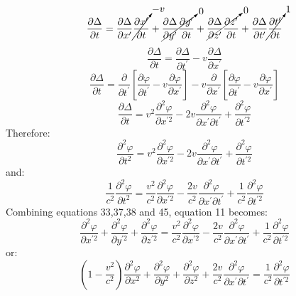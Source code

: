 \documentclass[journal]{IEEEtran}
\begin{document}
\begin{equation}
\frac{\partial\Delta}{\partial t} =
\frac{\partial\Delta}{\partial x^\prime}
\cancelto{-v}{\frac{\partial x^\prime}{\partial t}} +
\cancelto{0}{\frac{\partial\Delta}{\partial y^\prime}
\frac{\partial y^\prime}{\partial t}} +
\cancelto{0}{\frac{\partial\Delta}{\partial z^\prime}
\frac{\partial z^\prime}{\partial t}} +
\frac{\partial\Delta}{\partial t^\prime}
\cancelto{1}{\frac{\partial t^\prime}{\partial t}}
\end{equation}
\begin{equation}
\frac{\partial\Delta}{\partial t} =
\frac{\partial\Delta}{\partial t^\prime}
- v \frac{\partial\Delta}{\partial x^\prime}
\end{equation}
\begin{equation}
\frac{\partial\Delta}{\partial t} = 
\frac{\partial}{\partial t^\prime}
\left[\frac{\partial\varphi}{\partial t^\prime} -
v\frac{\partial\varphi}{\partial x^\prime}\right] - v
\frac{\partial}{\partial x^\prime}
\left[\frac{\partial\varphi}{\partial t^\prime} -
v\frac{\partial\varphi}{\partial x^\prime}\right]
\end{equation}
\begin{equation}
\frac{\partial\Delta}{\partial t} = 
v^2\frac{\partial^2\varphi}{\partial x^{\prime2}} - 2v
\frac{\partial^2\varphi}{\partial x^\prime\partial t^\prime} +
\frac{\partial^2\varphi}{\partial t^{\prime2}}
\end{equation}
Therefore:
\begin{equation}
\frac{\partial^2\varphi}{\partial t^2} =
v^2\frac{\partial^2\varphi}{\partial x^{\prime2}} - 2v
\frac{\partial^2\varphi}{\partial x^\prime\partial t^\prime} +
\frac{\partial^2\varphi}{\partial t^{\prime2}}
\end{equation}
and:
\begin{equation}
\boxed{
\frac{1}{c^2}\frac{\partial^2\varphi}{\partial t^2} =
\frac{v^2}{c^2}\frac{\partial^2\varphi}{\partial x^{\prime2}} -
\frac{2v}{c^2}
\frac{\partial^2\varphi}{\partial x^\prime\partial t^\prime} +
\frac{1}{c^2}\frac{\partial^2\varphi}{\partial t^{\prime2}}
}
\end{equation}
Combining equations 33,37,38 and 45, equation 11 becomes:
\begin{equation}
\boxed{
\frac{\partial^2\varphi}{\partial x^{\prime2}} +
\frac{\partial^2\varphi}{\partial y^{\prime2}} +
\frac{\partial^2\varphi}{\partial z^{\prime2}} =
\frac{v^2}{c^2}\frac{\partial^2\varphi}{\partial x^{\prime2}} -
\frac{2v}{c^2}
\frac{\partial^2\varphi}{\partial x^\prime\partial t^\prime} +
\frac{1}{c^2}\frac{\partial^2\varphi}{\partial t^{\prime2}}
}
\end{equation}
or:
\begin{equation}
\boxed{
\left(1 - \frac{v^2}{c^2}\right)
\frac{\partial^2\varphi}{\partial x^2} +
\frac{\partial^2\varphi}{\partial y^2} +
\frac{\partial^2\varphi}{\partial z^2}  +
\frac{2v}{c^2}
\frac{\partial^2\varphi}{\partial x^\prime\partial t^\prime} =
\frac{1}{c^2}\frac{\partial^2\varphi}{\partial t^{\prime2}}
}
\end{equation}
\end{document}
